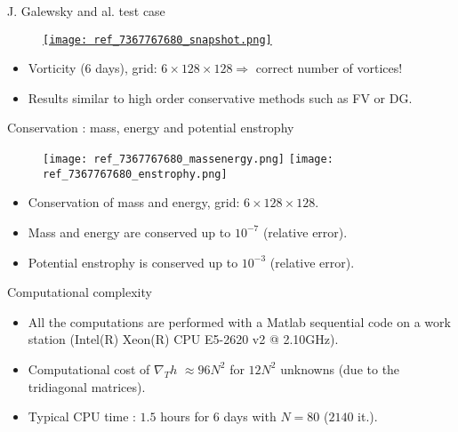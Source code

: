 \documentclass[11pt]{beamer}
\begin{document}

\begin{frame}{J. Galewsky and al. test case}
\begin{figure}
\href{run:ref_7367787500.avi}{\texttt{[image: ref\_7367767680\_snapshot.png]}} 
\end{figure}
\begin{itemize}
\item Vorticity (6 days), grid: $6 \times 128 \times 128 \Rightarrow $ correct number of vortices!
\item Results similar to high order conservative methods such as FV or DG.
\end{itemize}
\end{frame}


\begin{frame}{Conservation : mass, energy and potential enstrophy}
\begin{figure}
\texttt{[image: ref\_7367767680\_massenergy.png]}
\texttt{[image: ref\_7367767680\_enstrophy.png]}
\end{figure}
\begin{itemize}
\item Conservation of mass and energy, grid: $6 \times 128 \times 128$.
\item Mass and energy are conserved up to $10^{-7}$ (relative error).
\item Potential enstrophy is conserved up to $10^{-3}$ (relative error).
\end{itemize}
\end{frame}


\begin{frame}{Computational complexity}
\begin{itemize}
\item All the computations are performed with a Matlab sequential code on a work station (Intel(R) Xeon(R) CPU E5-2620 v2 @ 2.10GHz).
\item Computational cost of $\nabla_T h$ $\approx 96N^2$ for $12N^2$ unknowns (due to the tridiagonal matrices).
\item Typical CPU time : $1.5$ hours for $6$ days with $N=80$ ($2140$ it.).
\end{itemize}
\end{frame}
\end{document}
